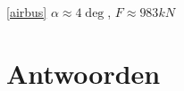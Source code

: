 \begin{antwoord}{\ref{airbus}}
	$\alpha \approx 4\deg$, $F \approx 983\unit{kN}$
\end{antwoord}


\section*{Antwoorden}
	\begin{multicols}{2}
	\end{multicols}